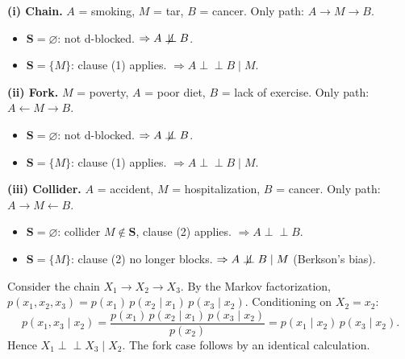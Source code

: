 \documentclass[
  a4paper,
]{book}
\providecommand{\tightlist}{%
  \setlength{\itemsep}{0pt}\setlength{\parskip}{0pt}}
\newcommand{\indep}{\perp\!\!\!\perp}
\newcommand{\nindep}{\centernot{\indep}}
\begin{document}
\begin{tcolorbox}[enhanced jigsaw, arc=.35mm, bottomrule=.15mm, bottomtitle=1mm, breakable, colback=white, colbacktitle=quarto-callout-note-color!10!white, colframe=quarto-callout-note-color-frame, coltitle=black, left=2mm, leftrule=.75mm, opacityback=0, opacitybacktitle=0.6, rightrule=.15mm, title={Example: Applying the d-Separation Definition to the Three Toy Settings}, titlerule=0mm, toprule=.15mm, toptitle=1mm]

\textbf{(i) Chain.} \(A\) = smoking, \(M\) = tar, \(B\) = cancer. Only
path: \(A \to M \to B\).

\begin{itemize}
\tightlist
\item
  \(\mathbf{S} = \varnothing\): not d-blocked.
  \(\Rightarrow A \nindep B\).
\item
  \(\mathbf{S} = \{M\}\): clause (1) applies.
  \(\Rightarrow A \indep B \mid M\).
\end{itemize}

\textbf{(ii) Fork.} \(M\) = poverty, \(A\) = poor diet, \(B\) = lack of
exercise. Only path: \(A \leftarrow M \to B\).

\begin{itemize}
\tightlist
\item
  \(\mathbf{S} = \varnothing\): not d-blocked.
  \(\Rightarrow A \nindep B\).
\item
  \(\mathbf{S} = \{M\}\): clause (1) applies.
  \(\Rightarrow A \indep B \mid M\).
\end{itemize}

\textbf{(iii) Collider.} \(A\) = accident, \(M\) = hospitalization,
\(B\) = cancer. Only path: \(A \to M \leftarrow B\).

\begin{itemize}
\tightlist
\item
  \(\mathbf{S} = \varnothing\): collider \(M \notin \mathbf{S}\), clause
  (2) applies. \(\Rightarrow A \indep B\).
\item
  \(\mathbf{S} = \{M\}\): clause (2) no longer blocks.
  \(\Rightarrow A \nindep B \mid M\) (Berkson's bias).
\end{itemize}

\end{tcolorbox}

\begin{tcolorbox}[enhanced jigsaw, arc=.35mm, bottomrule=.15mm, bottomtitle=1mm, breakable, colback=white, colbacktitle=quarto-callout-note-color!10!white, colframe=quarto-callout-note-color-frame, coltitle=black, left=2mm, leftrule=.75mm, opacityback=0, opacitybacktitle=0.6, rightrule=.15mm, title={Example: A Direct Probability Proof for the Chain}, titlerule=0mm, toprule=.15mm, toptitle=1mm]

Consider the chain \(X_1 \to X_2 \to X_3\). By the Markov factorization,
\(p(x_1, x_2, x_3) = p(x_1)\,p(x_2 \mid x_1)\,p(x_3 \mid x_2)\).
Conditioning on \(X_2 = x_2\):
\[p(x_1, x_3 \mid x_2) = \frac{p(x_1)\,p(x_2 \mid x_1)\,p(x_3 \mid x_2)}{p(x_2)} = p(x_1 \mid x_2)\,p(x_3 \mid x_2).\]
Hence \(X_1 \indep X_3 \mid X_2\). The fork case follows by an identical
calculation.

\end{tcolorbox}
\end{document}
